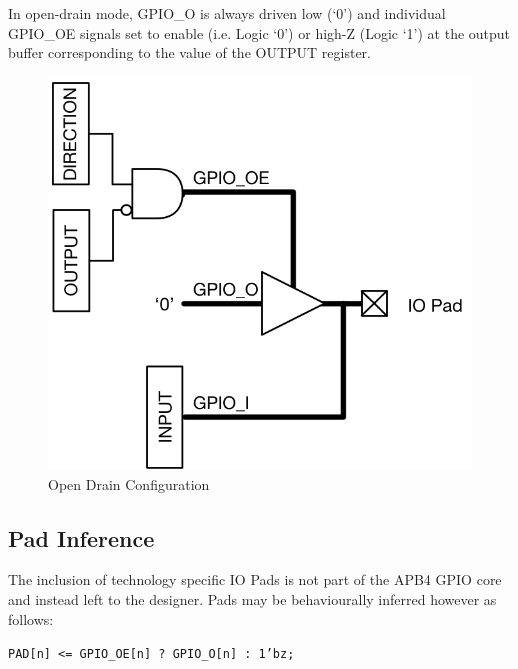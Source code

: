 In open-drain mode, GPIO\_O is always driven low (`0') and individual
GPIO\_OE signals set to enable (i.e. Logic `0') or high-Z (Logic `1') at
the output buffer corresponding to the value of the OUTPUT register.

\begin{figure}[tbh]
	\centering
	\includegraphics{assets/img/apb4-gpio-od.png}
	\caption{Open Drain Configuration}
	\label{fig:apb4-gpio-od}
\end{figure}

\subsection{Pad Inference}\label{pad-inference}

The inclusion of technology specific IO Pads is not part of the APB4
GPIO core and instead left to the designer. Pads may be behaviourally
inferred however as follows:

\texttt{PAD[n] <= GPIO\_OE[n] ? GPIO\_O[n] : 1'bz;}
